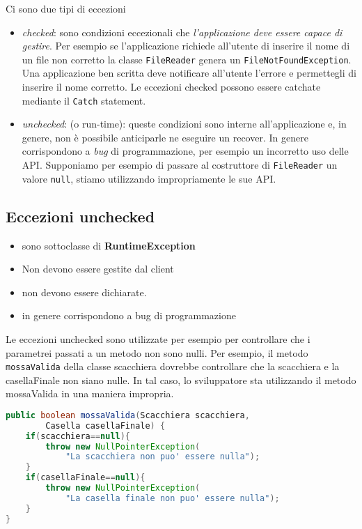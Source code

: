\documentclass{article}
\begin{document}
Ci sono due tipi di eccezioni
\begin{itemize}
\item \emph{checked}: sono condizioni eccezionali che \emph{l'applicazione deve essere capace di gestire}. Per esempio se l'applicazione richiede all'utente di inserire il nome di un file non corretto la classe \texttt{FileReader} genera un \texttt{FileNotFoundException}. Una applicazione ben scritta deve notificare all'utente l'errore e permettegli di inserire il nome corretto. Le eccezioni checked possono essere catchate mediante il \texttt{Catch} statement.
\item \emph{unchecked}: (o run-time): queste condizioni sono interne all'applicazione e, in genere, non \`e possibile anticiparle ne eseguire un recover. In genere corrispondono a \emph{bug} di programmazione, per esempio un incorretto uso delle API. Supponiamo per esempio di passare al costruttore di \texttt{FileReader} un valore \texttt{null}, stiamo utilizzando impropriamente le sue API.
\end{itemize}


\subsection{Eccezioni unchecked}
\begin{itemize}
\item sono sottoclasse di \textbf{RuntimeException}
\item Non devono essere gestite dal client 
\item non devono essere dichiarate.
\item in genere corrispondono a bug di programmazione
\end{itemize}

Le eccezioni unchecked sono utilizzate per esempio per controllare che i parametrei passati a un metodo non sono nulli. Per esempio, il metodo \texttt{mossaValida} della classe scacchiera dovrebbe controllare che la scacchiera e la casellaFinale non siano nulle. In tal caso, lo sviluppatore sta utilizzando il metodo mossaValida in una maniera impropria.
\begin{lstlisting}[language=Java]
public boolean mossaValida(Scacchiera scacchiera, 
        Casella casellaFinale) {
    if(scacchiera==null){
        throw new NullPointerException(
            "La scacchiera non puo' essere nulla");
    }
    if(casellaFinale==null){
        throw new NullPointerException(
            "La casella finale non puo' essere nulla");
    }
}
\end{lstlisting}
\end{document}
